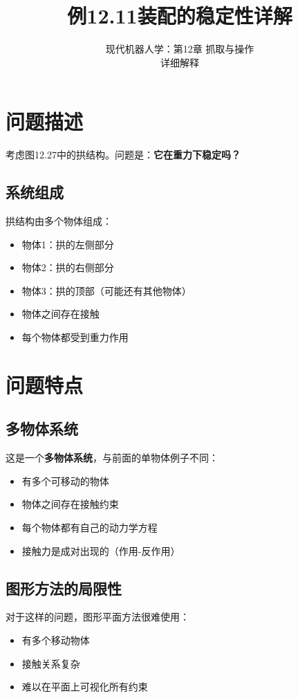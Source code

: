 \documentclass[12pt,a4paper]{article}
\title{例12.11\quad 装配的稳定性\quad 详解}
\author{现代机器人学：第12章 抓取与操作\\
详细解释}
\date{}
\begin{document}
\maketitle

\section{问题描述}

考虑图12.27中的拱结构。问题是：\textbf{它在重力下稳定吗？}

\subsection{系统组成}

拱结构由多个物体组成：
\begin{itemize}
    \item 物体1：拱的左侧部分
    \item 物体2：拱的右侧部分
    \item 物体3：拱的顶部（可能还有其他物体）
    \item 物体之间存在接触
    \item 每个物体都受到重力作用
\end{itemize}

\section{问题特点}

\subsection{多物体系统}

这是一个\textbf{多物体系统}，与前面的单物体例子不同：
\begin{itemize}
    \item 有多个可移动的物体
    \item 物体之间存在接触约束
    \item 每个物体都有自己的动力学方程
    \item 接触力是成对出现的（作用-反作用）
\end{itemize}

\subsection{图形方法的局限性}

对于这样的问题，图形平面方法很难使用：
\begin{itemize}
    \item 有多个移动物体
    \item 接触关系复杂
    \item 难以在平面上可视化所有约束
\end{itemize}
\end{document}
